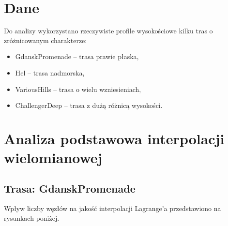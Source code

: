\documentclass[11pt,a4paper]{article}
\begin{document}
\section{Dane}
Do analizy wykorzystano rzeczywiste profile wysokościowe kilku tras o zróżnicowanym charakterze:
\begin{itemize}
    \item GdanskPromenade -- trasa prawie płaska,
    \item Hel -- trasa nadmorska,
    \item VariousHills -- trasa o wielu wzniesieniach,
    \item ChallengerDeep -- trasa z dużą różnicą wysokości.
\end{itemize}

\section{Analiza podstawowa interpolacji wielomianowej}
\subsection{Trasa: GdanskPromenade}
Wpływ liczby węzłów na jakość interpolacji Lagrange'a przedstawiono na rysunkach poniżej.
\end{document}
